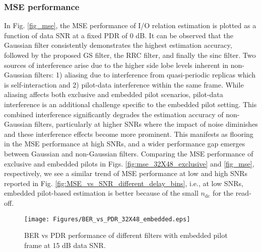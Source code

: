 \vspace{1mm}
\subsubsection{MSE performance}
In Fig. \ref{fig_mse}, the MSE performance of I/O relation estimation is plotted as a function of data SNR at a fixed PDR of 0 dB. It can be observed that the Gaussian filter consistently demonstrates the highest estimation accuracy, followed by the proposed GS filter, the RRC filter, and finally the sinc filter. Two sources of interference arise due to the higher side lobe levels inherent in non-Gaussian filters: 1) aliasing due to interference from quasi-periodic replicas which is self-interaction and 2) pilot-data interference within the same frame. While aliasing affects both exclusive and embedded pilot scenarios, pilot-data interference is an additional challenge specific to the embedded pilot setting. This combined interference significantly degrades the estimation accuracy of non-Gaussian filters, particularly at higher SNRs where the impact of noise diminishes and these interference effects become more prominent. This manifests as flooring in the MSE performance at high SNRs, and a wider performance gap emerges between Gaussian and non-Gaussian filters. Comparing the MSE performance of exclusive and embedded pilots in Figs. \ref{fig:mse_32X48_exclusive} and \ref{fig_mse}, respectively, we see a similar trend of MSE performance at low and high SNRs reported in Fig. \ref{fig:MSE_vs_SNR_different_delay_bins}, i.e., at low SNRs, embedded pilot-based estimation is better because of the small $n_{\mathrm{dc}}$ for the read-off. 


\begin{figure}[!t]
\centering
\texttt{[image: Figures/BER\_vs\_PDR\_32X48\_embedded.eps]}
\caption{BER vs PDR performance of different filters with embedded pilot frame at 15 dB data SNR.}
\label{fig_ber_pdr}
\vspace{-4mm}
\end{figure}


\vspace{1mm}
